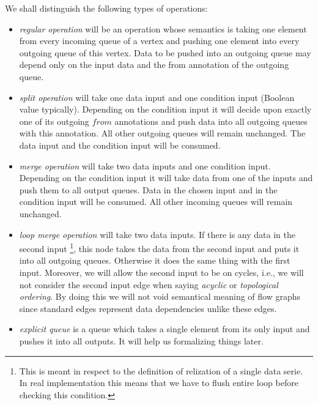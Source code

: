 \begin{define}
  We shall distinguish the following types of operations:
\begin{itemize}
  \item \emph{regular operation} will be an operation whose semantics is taking one element from every incoming queue of a vertex and pushing one element into every outgoing queue of this vertex. Data to be pushed into an outgoing queue may depend only on the input data and the from annotation of the outgoing queue.
  \item \emph{split operation} will take one data input and one condition input (Boolean value typically). Depending on the condition input it will decide upon exactly one of its outgoing $from$ annotations and push data into all outgoing queues with this annotation. All other outgoing queues will remain unchanged. The data input and the condition input will be consumed.
  \item \emph{merge operation} will take two data inputs and one condition input. Depending on the condition input it will take data from one of the inputs and push them to all output queues. Data in the chosen input and in the condition input will be consumed. All other incoming queues will remain unchanged.

  \item \emph{loop merge operation} will take two data inputs. If there is any data in the second input \footnote{This is meant in respect to the definition of relization of a single data serie. In real implementation this means that we have to flush entire loop before checking this condition.}, this node takes the data from the second input and puts it into all outgoing queues. Otherwise it does the same thing with the first input. Moreover, we will allow the second input to be on cycles, i.e., we will not consider the second input edge when saying \emph{acyclic} or \emph{topological ordering}. By doing this we will not void semantical meaning of flow graphs since standard edges represent data dependencies unlike these edges.
  \item \emph{explicit queue} is a queue which takes a single element from its only input and pushes it into all outputs. It will help us formalizing things later.
\end{itemize}
\end{define}

